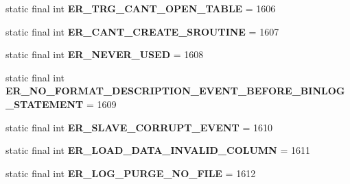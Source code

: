 \begin{DoxyCompactItemize}
static final int {\bfseries E\+R\+\_\+\+T\+R\+G\+\_\+\+C\+A\+N\+T\+\_\+\+O\+P\+E\+N\+\_\+\+T\+A\+B\+LE} = 1606
\item 
\mbox{\label{classcom_1_1mysql_1_1cj_1_1exceptions_1_1_mysql_error_numbers_a7d49caa7fdedb3a8e20523e00a5dd119}} 
static final int {\bfseries E\+R\+\_\+\+C\+A\+N\+T\+\_\+\+C\+R\+E\+A\+T\+E\+\_\+\+S\+R\+O\+U\+T\+I\+NE} = 1607
\item 
\mbox{\label{classcom_1_1mysql_1_1cj_1_1exceptions_1_1_mysql_error_numbers_a914585df8ed13683eff51c830c1442af}} 
static final int {\bfseries E\+R\+\_\+\+N\+E\+V\+E\+R\+\_\+\+U\+S\+ED} = 1608
\item 
\mbox{\label{classcom_1_1mysql_1_1cj_1_1exceptions_1_1_mysql_error_numbers_a274747d6152340989f697e57d47bc744}} 
static final int {\bfseries E\+R\+\_\+\+N\+O\+\_\+\+F\+O\+R\+M\+A\+T\+\_\+\+D\+E\+S\+C\+R\+I\+P\+T\+I\+O\+N\+\_\+\+E\+V\+E\+N\+T\+\_\+\+B\+E\+F\+O\+R\+E\+\_\+\+B\+I\+N\+L\+O\+G\+\_\+\+S\+T\+A\+T\+E\+M\+E\+NT} = 1609
\item 
\mbox{\label{classcom_1_1mysql_1_1cj_1_1exceptions_1_1_mysql_error_numbers_ab4aa4b655f0ceb50a0a381be9a5e951e}} 
static final int {\bfseries E\+R\+\_\+\+S\+L\+A\+V\+E\+\_\+\+C\+O\+R\+R\+U\+P\+T\+\_\+\+E\+V\+E\+NT} = 1610
\item 
\mbox{\label{classcom_1_1mysql_1_1cj_1_1exceptions_1_1_mysql_error_numbers_a295ea664701e49ee2d132bcac704fa6b}} 
static final int {\bfseries E\+R\+\_\+\+L\+O\+A\+D\+\_\+\+D\+A\+T\+A\+\_\+\+I\+N\+V\+A\+L\+I\+D\+\_\+\+C\+O\+L\+U\+MN} = 1611
\item 
\mbox{\label{classcom_1_1mysql_1_1cj_1_1exceptions_1_1_mysql_error_numbers_a49e330fccaf4b01af8c8f390f761aeb7}} 
static final int {\bfseries E\+R\+\_\+\+L\+O\+G\+\_\+\+P\+U\+R\+G\+E\+\_\+\+N\+O\+\_\+\+F\+I\+LE} = 1612
\item 
\mbox{\label{classcom_1_1mysql_1_1cj_1_1exceptions_1_1_mysql_error_numbers_a19ba714bd03ddbe14a3a202ec3bc7d74}} 

\end{DoxyCompactItemize}
